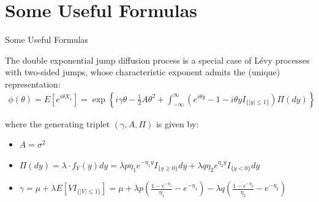 \documentclass{beamer}
\begin{document}
\section{Some Useful Formulas}
\begin{frame}{Some Useful Formulas}

    {\footnotesize \footnotesize
    \par The double exponential jump diffusion process is a special 
    case of L\'evy processes with two-sided jumps, whose characteristic exponent admits the (unique) representation: 
    \vspace{1em}
    \begin{align*}
    \phi(\theta) = E[e^{i\theta X_1}] = \exp\left\{i\gamma\theta - \frac{1}{2}A\theta^2 
    + \int_{-\infty}^{\infty}(e^{i\theta y} - 1 - i\theta y I_{\{|y|\leq 1\}})\Pi(dy)\right\}
    \end{align*}\vspace{1em}
    \par where the generating triplet $(\gamma, A, \Pi)$ is given by:
    \vspace{1em}
    \begin{itemize}
        \item $A = \sigma^2$
        \item $\Pi(dy) = \lambda \cdot f_Y(y)dy 
        = \lambda p \eta_1 e^{-\eta_1 y} I_{\{y\geq 0\}} dy + \lambda q \eta_2 e^{\eta_2 y} I_{\{y<0\}} dy$
        \item $\gamma = \mu + \lambda E[V I_{\{|V|\leq 1\}}] = \mu + \lambda p \left( \frac{1 - e^{-\eta_1}}{\eta_1} 
        - e^{-\eta_1} \right) - \lambda q \left( \frac{1 - e^{-\eta_2}}{\eta_2} - e^{-\eta_2} \right)$
    \end{itemize}
    
    
    }

    
\end{frame}
\end{document}
